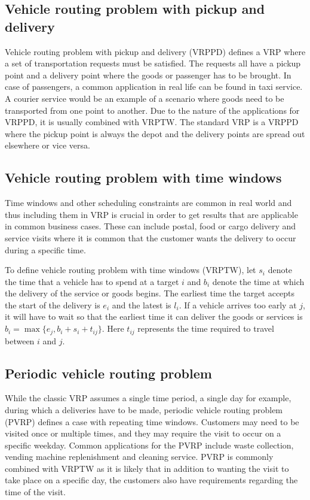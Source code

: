 \subsection{Vehicle routing problem with pickup and delivery}

Vehicle routing problem with pickup and delivery (VRPPD) defines a VRP where a set of transportation requests must be satisfied. The requests all have a pickup point and a delivery point where the goods or passenger has to be brought. In case of passengers, a common application in real life can be found in taxi service. A courier service would be an example of a scenario where goods need to be transported from one point to another. Due to the nature of the applications for VRPPD, it is usually combined with VRPTW. The standard VRP is a VRPPD where the pickup point is always the depot and the delivery points are spread out elsewhere or vice versa. \cite{desaulniers2000vrp}


\subsection{Vehicle routing problem with time windows}

Time windows and other scheduling constraints are common in real world and thus including them in VRP is crucial in order to get results that are applicable in common business cases. These can include postal, food or cargo delivery and service visits where it is common that the customer wants the delivery to occur during a specific time. \cite{cordeau2000vrp}

To define vehicle routing problem with time windows (VRPTW), let $s_i$ denote the time that a vehicle has to spend at a target $i$ and $b_i$ denote the time at which the delivery of the service or goods begins. The earliest time the target accepts the start of the delivery is $e_i$ and the latest is $l_i$. If a vehicle arrives too early at $j$, it will have to wait so that the earliest time it can deliver the goods or services is $b_i = \max\{e_j, b_i + s_i + t_{ij}\}$. Here $t_{ij}$ represents the time required to travel between $i$ and $j$. \cite{solomon1987algorithms}


\subsection{Periodic vehicle routing problem}

While the classic VRP assumes a single time period, a single day for example, during which a deliveries have to be made, periodic vehicle routing problem (PVRP) defines a case with repeating time windows. Customers may need to be visited once or multiple times, and they may require the visit to occur on a specific weekday. \cite{blakeley2003optimizing} Common applications for the PVRP include waste collection, vending machine replenishment and cleaning service. PVRP is commonly combined with VRPTW as it is likely that in addition to wanting the visit to take place on a specific day, the customers also have requirements regarding the time of the visit. \cite{yu2011ant}


